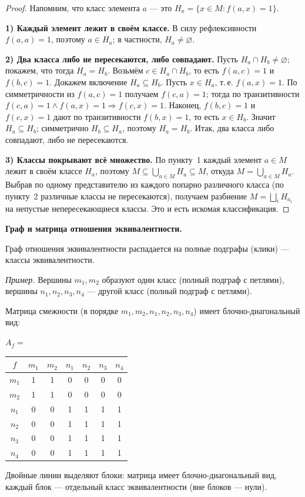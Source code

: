 \begin{proof}
Напомним, что класс элемента $a$ --- это $H_a=\{x\in M\colon f(a,x)=1\}$.

\textbf{1) Каждый элемент лежит в своём классе.} В силу рефлексивности
$f(a,a)=1$, поэтому $a\in H_a$; в частности, $H_a\neq\varnothing$.

\textbf{2) Два класса либо не пересекаются, либо совпадают.} Пусть
$H_a\cap H_b\neq\varnothing$; покажем, что тогда $H_a=H_b$. Возьмём
$c\in H_a\cap H_b$, то есть $f(a,c)=1$ и $f(b,c)=1$. Докажем включение
$H_a\subseteq H_b$. Пусть $x\in H_a$, т.\,е. $f(a,x)=1$. По симметричности из
$f(a,c)=1$ получаем $f(c,a)=1$; тогда по транзитивности
$f(c,a)=1\wedge f(a,x)=1\Rightarrow f(c,x)=1$. Наконец, $f(b,c)=1$ и
$f(c,x)=1$ дают по транзитивности $f(b,x)=1$, то есть $x\in H_b$. Значит
$H_a\subseteq H_b$; симметрично $H_b\subseteq H_a$, поэтому $H_a=H_b$. Итак,
два класса либо совпадают, либо не пересекаются.

\textbf{3) Классы покрывают всё множество.} По пункту~1 каждый элемент
$a\in M$ лежит в своём классе $H_a$, поэтому
$M\subseteq\bigcup_{a\in M}H_a\subseteq M$, откуда $M=\bigcup_{a\in M}H_a$.
Выбрав по одному представителю из каждого попарно различного класса
(по пункту~2 различные классы не пересекаются), получаем разбиение
$M=\bigsqcup_i H_{a_i}$ на непустые непересекающиеся классы. Это и есть
искомая классификация.
\end{proof}

\medskip
\textbf{Граф и матрица отношения эквивалентности.}

Граф отношения эквивалентности распадается на полные подграфы
(клики) --- классы эквивалентности.

\textit{Пример.} Вершины $m_1, m_2$ образуют один класс (полный подграф с петлями),
вершины $n_1, n_2, n_3, n_4$ --- другой класс (полный подграф с петлями).

Матрица смежности (в порядке $m_1, m_2, n_1, n_2, n_3, n_4$) имеет
блочно-диагональный вид:
\begin{center}
\renewcommand{\arraystretch}{1.25}
$A_f=$\;
\begin{tabular}{|c||c|c||c|c|c|c|}
\hline
$f$ & $m_1$ & $m_2$ & $n_1$ & $n_2$ & $n_3$ & $n_4$ \\ \hline\hline
$m_1$ & 1 & 1 & 0 & 0 & 0 & 0 \\ \hline
$m_2$ & 1 & 1 & 0 & 0 & 0 & 0 \\ \hline\hline
$n_1$ & 0 & 0 & 1 & 1 & 1 & 1 \\ \hline
$n_2$ & 0 & 0 & 1 & 1 & 1 & 1 \\ \hline
$n_3$ & 0 & 0 & 1 & 1 & 1 & 1 \\ \hline
$n_4$ & 0 & 0 & 1 & 1 & 1 & 1 \\ \hline
\end{tabular}
\end{center}
\noindent Двойные линии выделяют блоки: матрица имеет блочно-диагональный
вид, каждый блок --- отдельный класс эквивалентности (вне блоков --- нули).


